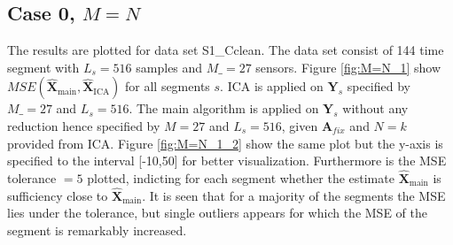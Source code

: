 \subsection{Case 0, $M=N$}
The results are plotted for data set S1\_Cclean. The data set consist of 144 time segment with $L_s = 516$ samples and $M\_ = 27$ sensors. Figure \ref{fig:M=N_1} show $MSE\left(\hat{\mathbf{X}}_{\text{main}},\hat{\mathbf{X}}_{\text{ICA}}\right)$ for all segments $s$. ICA is applied on $\textbf{Y}_s$ specified by $M\_ = 27$ and $L_s = 516$. The main algorithm is applied on $\textbf{Y}_s$ without any reduction hence specified by $M=27$ and $L_s=516$, given $\textbf{A}_{fix}$ and $N = k$ provided from ICA.
Figure \ref{fig:M=N_1_2} show the same plot but the y-axis is specified to the interval [-10,50] for better visualization.
Furthermore is the MSE tolerance $= 5$ plotted, indicting for each segment whether the estimate $\hat{\mathbf{X}}_{\text{main}}$ is sufficiency close to $\hat{\mathbf{X}}_{\text{main}}$. It is seen that for a majority of the segments the MSE lies under the tolerance, but single outliers appears for which the MSE of the segment is remarkably increased.    
